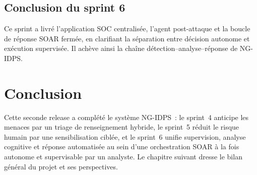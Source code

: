 \subsection{Conclusion du sprint 6}
Ce sprint a livré l'application SOC centralisée, l'agent post-attaque et la boucle de réponse \ac{SOAR} fermée, en clarifiant la séparation entre décision autonome et exécution supervisée. Il achève ainsi la chaîne détection--analyse--réponse de NG-IDPS.

\section*{Conclusion}
Cette seconde release a complété le système NG-IDPS~: le sprint~4 anticipe les menaces par un triage de renseignement hybride, le sprint~5 réduit le risque humain par une sensibilisation ciblée, et le sprint~6 unifie supervision, analyse cognitive et réponse automatisée au sein d'une orchestration \ac{SOAR} à la fois autonome et supervisable par un analyste. Le chapitre suivant dresse le bilan général du projet et ses perspectives.